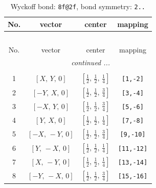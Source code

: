 \documentclass[fleqn,8pt]{jsarticle}
\begin{document}
\begin{longtable}{cccc}
\caption{Wyckoff bond: {\tt 8f@2f}, bond symmetry: {\tt 2..}}
 \\
 \hline \hline
No. & vector & center & mapping \\ \hline \endfirsthead

\multicolumn{3}{l}{\tablename\ \thetable{}} \\
 \hline \hline
No. & vector & center & mapping \\ \hline \endhead

 \hline \hline
\multicolumn{3}{r}{\footnotesize\it continued ...} \\ \endfoot

 \hline \hline
\multicolumn{3}{r}{} \\ \endlastfoot

1 & $\left[ X,\, Y,\, 0 \right]$ & $\left[ \frac{1}{2},\, \frac{1}{2},\, \frac{1}{4} \right]$ & {\tt [1,-2]} \\ \hline
2 & $\left[ - Y,\, X,\, 0 \right]$ & $\left[ \frac{1}{2},\, \frac{1}{2},\, \frac{3}{4} \right]$ & {\tt [3,-4]} \\ \hline
3 & $\left[ - X,\, Y,\, 0 \right]$ & $\left[ \frac{1}{2},\, \frac{1}{2},\, \frac{3}{4} \right]$ & {\tt [5,-6]} \\ \hline
4 & $\left[ Y,\, X,\, 0 \right]$ & $\left[ \frac{1}{2},\, \frac{1}{2},\, \frac{1}{4} \right]$ & {\tt [7,-8]} \\ \hline
5 & $\left[ - X,\, - Y,\, 0 \right]$ & $\left[ \frac{1}{2},\, \frac{1}{2},\, \frac{3}{4} \right]$ & {\tt [9,-10]} \\ \hline
6 & $\left[ Y,\, - X,\, 0 \right]$ & $\left[ \frac{1}{2},\, \frac{1}{2},\, \frac{1}{4} \right]$ & {\tt [11,-12]} \\ \hline
7 & $\left[ X,\, - Y,\, 0 \right]$ & $\left[ \frac{1}{2},\, \frac{1}{2},\, \frac{1}{4} \right]$ & {\tt [13,-14]} \\ \hline
8 & $\left[ - Y,\, - X,\, 0 \right]$ & $\left[ \frac{1}{2},\, \frac{1}{2},\, \frac{3}{4} \right]$ & {\tt [15,-16]} \\
\end{longtable}
\renewcommand{\arraystretch}{1.2}
\end{document}
